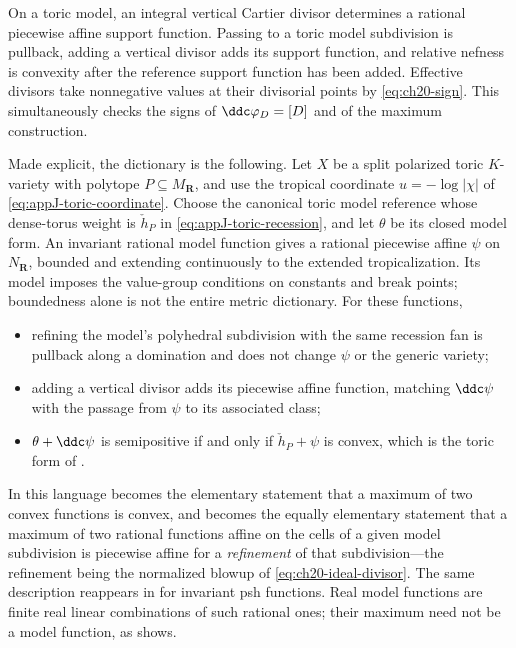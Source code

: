 \begin{example}
\label{ex:ch20-toric}
On a toric model, an integral vertical Cartier divisor determines a rational
piecewise affine support function.  Passing to a toric model subdivision is
pullback, adding a vertical divisor adds its support function, and relative
nefness is convexity after the reference support function has been added.
Effective divisors take nonnegative values at their divisorial points by
\eqref{eq:ch20-sign}.  This simultaneously checks the signs of
$\ddc\varphi_D=[D]$ and of the maximum construction.

Made explicit, the dictionary is the following.  Let $X$ be a split polarized
toric $K$-variety with polytope $P\subseteq M_{\mathbf R}$, and use the
tropical coordinate $u=-\log|\chi|$ of \eqref{eq:appJ-toric-coordinate}.
Choose the canonical toric model reference whose dense-torus weight is
$\check h_P$ in \eqref{eq:appJ-toric-recession}, and let $\theta$ be its
closed model form.  An invariant rational model function gives a rational
piecewise affine $\psi$ on $N_{\mathbf R}$, bounded and extending
continuously to the extended tropicalization.  Its model imposes the
value-group conditions on constants and break points; boundedness alone
is not the entire metric dictionary.  For these functions,
\begin{itemize}
\item refining the model's polyhedral subdivision with the same recession
 fan is pullback along a domination and does not change $\psi$ or the
 generic variety;
\item adding a vertical divisor adds its piecewise affine function, matching
 $\ddc\psi$ with the passage from $\psi$ to its associated class;
\item $\theta+\ddc\psi$ is semipositive if and only if
 $\check h_P+\psi$ is convex, which is the toric form of
 .
\end{itemize}
In this language  becomes the elementary statement
that a maximum of two convex functions is convex, and
 becomes the equally elementary statement
that a maximum of two rational functions affine on the cells of a given
model subdivision is piecewise affine for a \emph{refinement} of that
subdivision---the refinement being
the normalized blowup of \eqref{eq:ch20-ideal-divisor}.  The same
description reappears in  for invariant psh functions.
Real model functions are finite real linear combinations of such rational
ones; their maximum need not be a model function, as
 shows.


\end{example}
